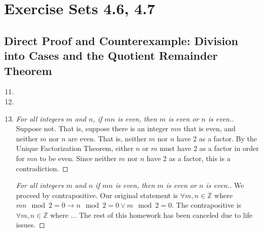 \documentclass[12pt]{article}
\begin{document}
\setcounter{section}{4}
\section*{Exercise Sets 4.6, 4.7}

\subsection{Direct Proof and Counterexample: Division into Cases and the Quotient Remainder Theorem} 
\begin{enumerate}
\setcounter{enumi}{10} %
\item %

\setcounter{enumi}{12} %
\item %

\setcounter{enumi}{27} %
\item %
  \begin{proof}[For all integers $m$ and $n$, if $mn$ is even, then $m$ is even or $n$ is even.]
    Suppose not. That is, suppose there is an integer $mn$ that is even, and neither $m$ nor $n$ are even.
That is, neither $m$ nor $n$ have 2 as a factor.
By the Unique Factorization Theorem, either $n$ or $m$ must have 2 as a factor in order for $mn$ to be
even. Since neither $m$ nor $n$ have 2 as a factor, this is a contradiction.
  \end{proof}

  \begin{proof}[For all integers $m$ and $n$ if $mn$ is even, then $m$ is even or $n$ is even.]
    We proceed by contrapositive. Our original statement is $\forall m,n \in \mathbb{Z}$ where $mn \mod{2} = 0
    \rightarrow n \mod{2} = 0 \vee m \mod{2} = 0$. The contrapositive is $\forall m,n \in \mathbb{Z}$ where
    ... The rest of this homework has been canceled due to life issues.
  \end{proof}

\end{enumerate}
\end{document}
